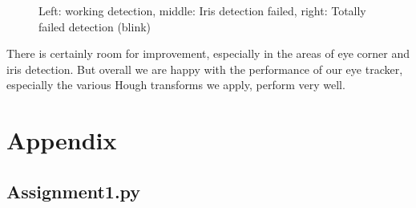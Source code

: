 \documentclass[a4paper,11pt]{article}
\begin{document}
\begin{figure}[H]
  \caption{Left: working detection, middle: Iris detection failed, right: Totally failed detection (blink)}
  \label{fig:results}
\end{figure}

There is certainly room for improvement, especially in the areas of eye corner and iris detection. But overall we are happy with the performance of our eye tracker, especially the various Hough transforms we apply, perform very well.
\newpage

\section*{Appendix}
\subsection{Assignment1.py}

\end{document}
